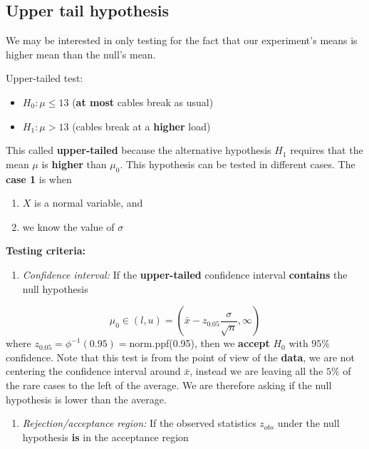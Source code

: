 \documentclass[
]{book}
\providecommand{\tightlist}{%
  \setlength{\itemsep}{0pt}\setlength{\parskip}{0pt}}
\begin{document}
\hypertarget{upper-tail-hypothesis}{%
\subsection{Upper tail hypothesis}\label{upper-tail-hypothesis}}

We may be interested in only testing for the fact that our experiment's means is higher mean than the null's mean.

Upper-tailed test:

\begin{itemize}
\tightlist
\item
  \(H_0:\mu \leq 13\) (\textbf{at most} cables break as usual)
\item
  \(H_1:\mu > 13\) (cables break at a \textbf{higher} load)
\end{itemize}

This called \textbf{upper-tailed} because the alternative hypothesis \(H_1\) requires that the mean \(\mu\) is \textbf{higher} than \(\mu_0\). This hypothesis can be tested in different cases. The \textbf{case 1} is when

\begin{enumerate}
\def\labelenumi{\arabic{enumi}.}
\tightlist
\item
  \(X\) is a normal variable, and
\item
  we know the value of \(\sigma\)
\end{enumerate}

\textbf{Testing criteria:}

\begin{enumerate}
\def\labelenumi{\arabic{enumi}.}
\tightlist
\item
  \emph{Confidence interval:} If the \textbf{upper-tailed} confidence interval \textbf{contains} the null hypothesis
\end{enumerate}

\[\mu_0\in (l,u)=(\bar{x}-z_{0.05} \frac{\sigma}{\sqrt{n}}, \infty)\]
where \(z_{0.05}=\phi^{-1}(0.95)=\)norm.ppf(0.95), then we \textbf{accept} \(H_0\) with \(95\%\) confidence. Note that this test is from the point of view of the \textbf{data}, we are not centering the confidence interval around \(\bar{x}\), instead we are leaving all the \(5\%\) of the rare cases to the left of the average. We are therefore asking if the null hypothesis is lower than the average.

\begin{enumerate}
\def\labelenumi{\arabic{enumi}.}
\setcounter{enumi}{1}
\tightlist
\item
  \emph{Rejection/acceptance region:} If the observed statistics \(z_{obs}\) under the null hypothesis \textbf{is} in the acceptance region
\end{enumerate}
\end{document}
